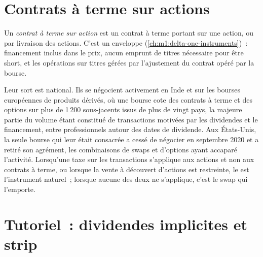 \section{Contrats à terme sur actions}

\begin{definition}\label{def:m1:index-and-single-stock-futures-worldwide:ssf}
Un \emph{contrat à terme sur action} est un contrat à terme portant sur une
action,  ou par livraison des actions. C'est un 
enveloppe (\cref{ch:m1:delta-one-instruments})~: financement inclus dans le prix, aucun
emprunt de titres nécessaire pour être short, et les opérations sur titres gérées par
l'ajustement du contrat opéré par la bourse.
\end{definition}

Leur sort est national. Ils se négocient activement en Inde et sur les
bourses européennes de produits dérivés, où une bourse cote des contrats à terme et des options
sur plus de 1\,200 sous-jacents issus de plus de vingt pays, la majeure partie du
volume étant constitué de transactions motivées par les dividendes et le financement, entre professionnels
autour des dates de dividende. Aux États-Unis, la seule bourse qui leur était consacrée
a cessé de négocier en septembre 2020 et a retiré son agrément, les combinaisons
de swaps et d'options ayant accaparé l'activité. Lorsqu'une taxe sur les
transactions s'applique aux actions et non aux contrats à terme, ou lorsque la vente
à découvert d'actions est restreinte, le  est l'instrument naturel~; lorsque
aucune des deux ne s'applique, c'est le swap qui l'emporte.

\section{Tutoriel~: dividendes implicites et strip}\label{tut:m1:index-and-single-stock-futures-worldwide:implied}

